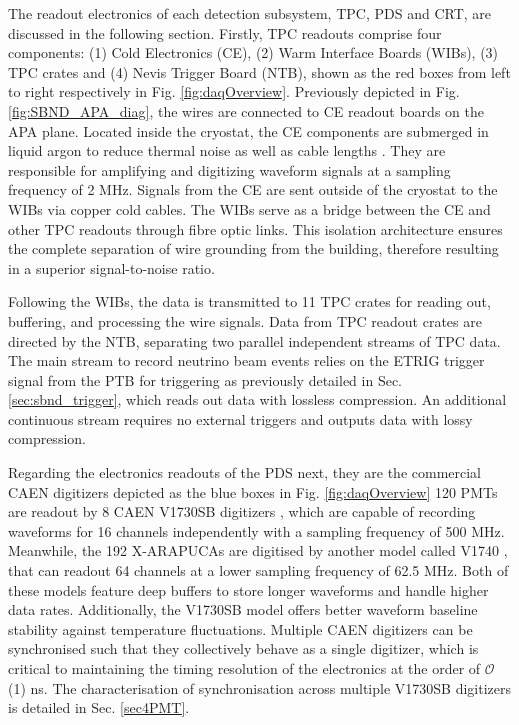 The readout electronics of each detection subsystem, TPC, PDS and CRT, are discussed in the following section.
Firstly, TPC readouts comprise four components: (1) Cold Electronics (CE), (2) Warm Interface Boards (WIBs), (3) TPC crates and (4) Nevis Trigger Board (NTB), shown as the red boxes from left to right respectively in Fig. \ref{fig:daqOverview}.
Previously depicted in Fig. \ref{fig:SBND_APA_diag}, the wires are connected to CE readout boards on the APA plane.
Located inside the cryostat, the CE components are submerged in liquid argon to reduce thermal noise as well as cable lengths \cite{SBND_CE}.
They are responsible for amplifying and digitizing waveform signals at a sampling frequency of 2 MHz. 
Signals from the CE are sent outside of the cryostat to the WIBs via copper cold cables.              
The WIBs serve as a bridge between the CE and other TPC readouts through fibre optic links.
This isolation architecture ensures the complete separation of wire grounding from the building, therefore resulting in a superior signal-to-noise ratio.

Following the WIBs, the data is transmitted to 11 TPC crates for reading out, buffering, and processing the wire signals. 
Data from TPC readout crates are directed by the NTB, separating two parallel independent streams of TPC data.
The main stream to record neutrino beam events relies on the ETRIG trigger signal from the PTB for triggering as previously detailed in Sec. \ref{sec:sbnd_trigger}, which reads out data with lossless
 compression.
An additional continuous stream requires no external triggers and outputs data with lossy compression. 

Regarding the electronics readouts of the PDS next, they are the commercial CAEN digitizers depicted as the blue boxes in Fig. \ref{fig:daqOverview}
120 PMTs are readout by 8 CAEN V1730SB digitizers \cite{caen1730}, which are capable of recording waveforms for 16 channels independently with a sampling frequency of 500 MHz.
Meanwhile, the 192 X-ARAPUCAs are digitised by another model called V1740 \cite{caen1740}, that can readout 64 channels at a lower sampling frequency of 62.5 MHz.              
Both of these models feature deep buffers to store longer waveforms and handle higher data rates.
Additionally, the V1730SB model offers better waveform baseline stability against temperature fluctuations.
Multiple CAEN digitizers can be synchronised such that they collectively behave as a single digitizer, which is critical to maintaining the timing resolution of the electronics at the order of $\mathcal{O}$(1) ns.
The characterisation of synchronisation across multiple V1730SB digitizers is detailed in Sec. \ref{sec4PMT}.

